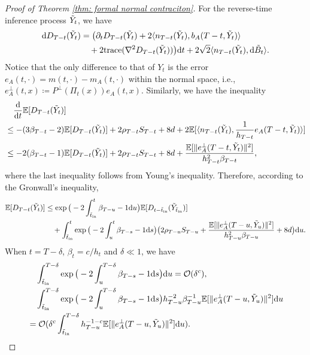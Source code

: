 \documentclass[10pt,a4paper]{amsart}
\newcommand{\Tr}{\mathrm{trace}}
\newcommand{\dee}{\mathrm{d}}
\newcommand{\mb}{\mathbb}
\newcommand{\mc}{\mathcal}
\begin{document}
\begin{proof}[Proof of Theorem \ref{thm: formal normal contraciton}]
\noindent For the reverse-time inference process $\Tilde{Y}_t$, we have
\begin{align*}
    \dee D_{T-t}(\Tilde{Y}_t) &= \big( \partial_t D_{T-t}(\Tilde{Y}_t) + 2\langle n_{T-t}(\Tilde{Y}_t), b_A(T-t,\Tilde{Y}_t) \rangle \\
    &\quad + 2\Tr(\nabla^2 D_{T-t}(\Tilde{Y}_t))\big)\dee t + 2\sqrt{2}\langle n_{T-t}(\Tilde{Y}_t),\dee \Tilde{B}_t \rangle.
\end{align*}
Notice that the only difference to that of $Y_t$ is the error $e_A(t,\cdot)=m(t,\cdot)-m_A(t,\cdot)$ within the normal space, i.e., $e_A^\perp(t,x)\coloneqq P^\perp(\Pi_t(x)) e_A(t,x)$. Similarly, we have the inequality
\begin{align*}
     &\quad \frac{\dee}{\dee t}\mb{E}[D_{T-t}(\Tilde{Y}_t)] \\
     &\le -(3\beta_{T-t}-2)\mb{E}[D_{T-t}(\Tilde{Y}_t)] + 2\rho_{T-t}S_{T-t} + 8d + 2\mb{E}[\langle n_{T-t}(\Tilde{Y}_t), \frac{1}{h_{T-t}}e_A(T-t,\Tilde{Y}_t) \rangle]\\
      &\le -2(\beta_{T-t}-1)\mb{E}[D_{T-t}(\Tilde{Y}_t)] + 2\rho_{T-t}S_{T-t} + 8d + \frac{\mb{E}[\| e_A^\perp(T-t,\Tilde{Y}_t)\|^2]}{h_{T-t}^2\beta_{T-t}},
\end{align*}
where the last inequality follows from Young's inequality. Therefore, according to the Gronwall's inequality,
\begin{align*}
    \mb{E}[D_{T-t}(\Tilde{Y}_t)] & \le  \exp\big( -2\int_{\Tilde{t}_{\mathrm{in}}}^t \beta_{T-u}-1 \dee u \big)\mb{E}[D_{t-\Tilde{t}_{\mathrm{in}}}(\Tilde{Y}_{\Tilde{t}_{\mathrm{in}}})] \\
    &\quad + \int_{\Tilde{t}_{\mathrm{in}}}^t \exp\big( -2\int_{u}^t \beta_{T-s}-1 \dee s \big) \big( 2\rho_{T-u}S_{T-u}+\frac{\mb{E}[\| e_A^\perp(T-u,\Tilde{Y}_u)\|^2]}{h_{T-u}^2\beta_{T-u}}+ 8d \big) \dee u .
\end{align*}
When $t=T-\delta$, $\beta_t=c/h_t$ and $\delta\ll 1$, we have
\begin{align*}
    &\quad\int_{\Tilde{t}_{\mathrm{in}}}^{T-\delta} \exp\big( -2\int_{u}^{T-\delta} \beta_{T-s}-1 \dee s \big) \dee u =\mc{O}(\delta^c) ,\\
    &\quad\int_{\Tilde{t}_{\mathrm{in}}}^{T-\delta} \exp\big( -2\int_{u}^{T-\delta} \beta_{T-s}-1 \dee s \big) h_{T-u}^{-2}\beta_{T-u}^{-1}\mb{E}[\| e_A^\perp(T-u,\Tilde{Y}_u)\|^2] \dee u \\
    & =\mc{O}(\delta^c \int_{\Tilde{t}_{\mathrm{in}}}^{T-\delta}  h_{T-u}^{-1-c}\mb{E}[\| e_A^\perp(T-u,\Tilde{Y}_u)\|^2] \dee u ) .
\end{align*}
\end{proof}
\end{document}
